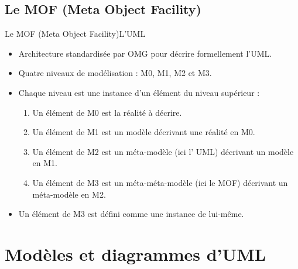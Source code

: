 \documentclass{beamer}
\begin{document}
    \subsection{Le MOF (Meta Object Facility)}
      \begin{frame}{Le MOF (Meta Object Facility)}{L'UML}
        \begin{itemize}
          \item {Architecture standardisée par OMG pour décrire formellement l'UML.\pause}
          \item<2->{Quatre niveaux de modélisation : M0, M1, M2 et M3.}
          \item<3->{Chaque niveau est une instance d'un élément du niveau supérieur :\pause
            \begin{enumerate}
              \item {Un élément de M0 est la réalité à décrire.\pause}
              \item{Un élément de M1 est un modèle décrivant une réalité en M0.\pause}
              \item{Un élément de M2 est un méta-modèle (ici l' UML) décrivant un modèle en M1.\pause}
              \item{Un élément de M3 est un méta-méta-modèle (ici le MOF) décrivant un méta-modèle en M2.\pause}
            \end{enumerate}
            }
            \item<4->{Un élément de M3 est défini comme une instance de lui-même.}
        \end{itemize}
      \end{frame}

\section{Modèles et diagrammes d'UML}

\end{document}
